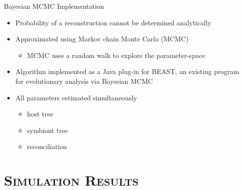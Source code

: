 \documentclass{beamer}
\let\oldsection\section
\renewcommand{\section}[1]{\oldsection{\textsc{#1}}\subsection{}}
\begin{document}
\begin{frame}{Bayesian MCMC Implementation}

\begin{itemize}

\item Probability of a reconstruction cannot be determined analytically \pause
\item Approximated using Markov chain Monte Carlo (MCMC)
\begin{itemize}
\item MCMC uses a random walk to explore the parameter-space
\end{itemize}
\pause
\item Algorithm implemented as a Java plug-in for BEAST, an existing program for evolutionary analysis via Bayesian MCMC \pause
\item All parameters estimated simultaneously
\begin{itemize}
\item host tree
\item symbiont tree
\item reconciliation
\end{itemize}

\end{itemize}

\end{frame}

\section{Simulation Results}
\end{document}
